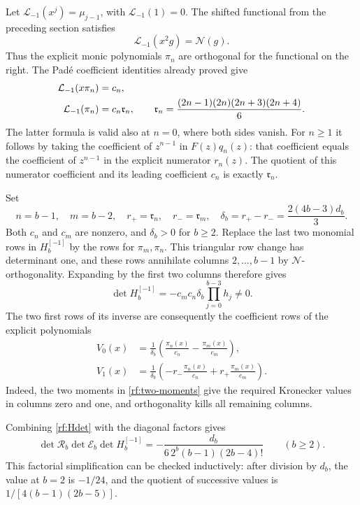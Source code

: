 \documentclass[11pt,a4paper]{article}
\numberwithin{equation}{section}
\theoremstyle{plain}
\theoremstyle{definition}
\theoremstyle{remark}
\begin{document}
Let $\mathcal L_{-1}(x^j)=\mu_{j-1}$, with
$\mathcal L_{-1}(1)=0$.  The shifted functional from the preceding
section satisfies
\[
 \mathcal L_{-1}(x^2g)=\mathcal N(g).
\]
Thus the explicit monic polynomials $\pi_n$ are orthogonal for the
functional on the right.  The Pad\'e coefficient identities already
proved give
\begin{align}
 \mathcal L_{-1}(x\pi_n)&=c_n,\notag\\
 \mathcal L_{-1}(\pi_n)&=c_n\mathfrak r_n,
 \qquad
 \mathfrak r_n=\frac{(2n-1)(2n)(2n+3)(2n+4)}6.
 \label{rf:two-moments}
\end{align}
The latter formula is valid also at $n=0$, where both sides vanish.
For $n\geq1$ it follows by taking the coefficient of $z^{n-1}$
in $F(z)q_n(z)$: that coefficient equals the coefficient of
$z^{n-1}$ in the explicit numerator $r_n(z)$.  The quotient of
this numerator coefficient and its leading coefficient $c_n$ is
exactly $\mathfrak r_n$.

Set
\[
 n=b-1,\quad m=b-2,\quad
 r_+=\mathfrak r_n,\quad r_-=\mathfrak r_m,
 \quad \delta_b=r_+-r_-
      =\frac{2(4b-3)d_b}{3}.
\]
Both $c_n$ and $c_m$ are nonzero, and $\delta_b>0$ for $b\geq2$.
Replace the last two monomial rows in $H_b^{[-1]}$ by the rows
for $\pi_m,\pi_n$.  This triangular row change has determinant
one, and these rows annihilate columns $2,\ldots,b-1$ by
$\mathcal N$-orthogonality.  Expanding by the first two columns
therefore gives
\begin{equation}\label{rf:Hdet}
 \det H_b^{[-1]}
 =-c_mc_n\delta_b\prod_{j=0}^{b-3}h_j\ne0.
\end{equation}
The two first rows of its inverse are consequently the coefficient
rows of the explicit polynomials
\begin{align}
 V_0(x)&=\frac1{\delta_b}
       \left(\frac{\pi_n(x)}{c_n}-\frac{\pi_m(x)}{c_m}\right),
       \label{rf:inverse0}\\
 V_1(x)&=\frac1{\delta_b}
       \left(-r_-\frac{\pi_n(x)}{c_n}
                       +r_+\frac{\pi_m(x)}{c_m}\right).
       \label{rf:inverse1}
\end{align}
Indeed, the two moments in \eqref{rf:two-moments} give the required
Kronecker values in columns zero and one, and orthogonality kills
all remaining columns.

Combining \eqref{rf:Hdet} with the diagonal factors gives
\begin{equation}\label{rf:base-scaled}
 \det\mathcal R_b\det\mathcal E_b\det H_b^{[-1]}
 =-\frac{d_b}{6\,2^b(b-1)(2b-4)!}\qquad(b\geq2).
\end{equation}
This factorial simplification can be checked inductively: after
division by $d_b$, the value at $b=2$ is $-1/24$, and the quotient
of successive values is $1/[4(b-1)(2b-5)]$.
\end{document}
